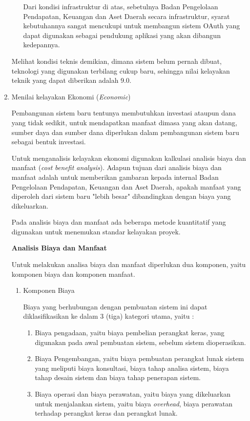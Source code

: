 \documentclass[pdftex,12pt, oneside]{article}
\begin{document}
\begin{enumerate}
\begin{enumerate}
Dari kondisi infrastruktur di atas, sebetulnya Badan Pengelolaan Pendapatan, Keuangan dan Aset Daerah secara infrastruktur, syarat kebutuhannya sangat mencukupi untuk membangun sistem OAuth yang dapat digunakan sebagai pendukung aplikasi yang akan dibangun kedepannya.
	
\end{enumerate}

Melihat kondisi teknis demikian, dimana sistem belum pernah dibuat, teknologi yang digunakan terbilang cukup baru, sehingga nilai kelayakan teknik yang dapat diberikan adalah 9.0.
	
	\item Menilai kelayakan Ekonomi (\textit{Economic})
	
Pembangunan sistem baru tentunya membutuhkan investasi ataupun dana yang tidak sedikit, untuk mendapatkan manfaat dimasa yang akan datang, sumber daya dan sumber dana diperlukan dalam pembangunan sistem baru sebagai bentuk investasi.

Untuk menganalisis kelayakan ekonomi digunakan kalkulasi analisis biaya dan manfaat (\textit{cost benefit analysis}). Adapun tujuan dari analisis biaya dan manfaat adalah untuk memberikan gambaran kepada internal Badan Pengelolaan Pendapatan, Keuangan dan Aset Daerah, apakah manfaat yang diperoleh dari sistem baru "lebih besar" dibandingkan dengan biaya yang dikeluarkan. 

Pada analisis biaya dan manfaat ada beberapa metode kuantitatif yang digunakan untuk menemukan standar kelayakan proyek.

\textbf{Analisis Biaya dan Manfaat}

Untuk melakukan analisa biaya dan manfaat diperlukan dua komponen, yaitu komponen biaya dan komponen manfaat.

\begin{enumerate}
	\item Komponen Biaya
	
Biaya yang berhubungan dengan pembuatan sistem ini dapat diklasifikasikan ke dalam 3 (tiga) kategori utama, yaitu :

\begin{enumerate}
	\item Biaya pengadaan, yaitu biaya pembelian perangkat keras, yang digunakan pada awal pembuatan sistem, sebelum sistem dioperasikan.
	\item Biaya Pengembangan, yaitu biaya pembuatan perangkat lunak sistem yang meliputi biaya konsultasi, biaya tahap analisa sistem, biaya tahap desain sistem dan biaya tahap penerapan sistem.
	\item Biaya operasi dan biaya perawatan, yaitu biaya yang dikeluarkan untuk menjalankan sistem, yaitu biaya \textit{overhead}, biaya perawatan terhadap perangkat keras dan perangkat lunak.
\end{enumerate}	
	

\end{enumerate}
\end{enumerate}
\end{document}
